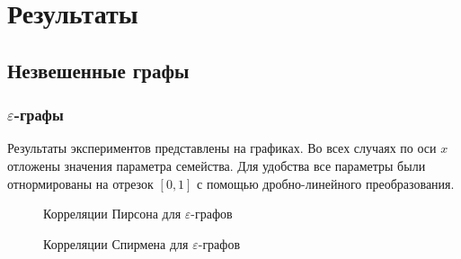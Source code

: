 \chapter{Результаты} \label{chapt3}


\section{Незвешенные графы} \label{sect3_1}

\subsection{$\varepsilon$-графы} \label{sect3_1_1}

Результаты экспериментов представлены на графиках.
Во всех случаях по оси $x$ отложены значения параметра семейства. Для удобства все параметры были отнормированы на отрезок $[0,1]$ с помощью дробно-линейного преобразования.

\begin{figure}[h]
  \begin{minipage}[h]{0.49\linewidth}
  \end{minipage}
  \hfill
  \begin{minipage}[h]{0.49\linewidth}
  \end{minipage}

  \caption{Корреляции Пирсона для $\varepsilon$-графов}
  \label{img:eps_graphs}  
\end{figure}

\begin{figure}[h]
  \begin{minipage}[h]{0.49\linewidth}
  \end{minipage}
  \hfill
  \begin{minipage}[h]{0.49\linewidth}
  \end{minipage}

  \caption{Корреляции Спирмена для $\varepsilon$-графов}
  \label{img:eps_graphs_sp}  
\end{figure}

